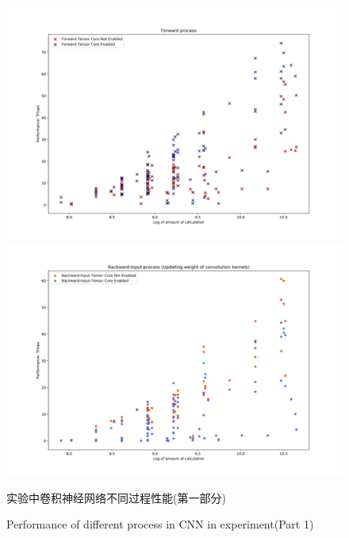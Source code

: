 \begin{figure}
	\centering
	\includegraphics[width=15cm]{figures/CNN-HALF-FWD.jpg}\\
	\includegraphics[width=15cm]{figures/CNN-HALF-BWD-FILTER.jpg}
	\renewcommand{\thefigure}{\arabic{section}-\arabic{figure} }
	\renewcommand{\figurename}{图}
	\caption{实验中卷积神经网络不同过程性能(第一部分)}
	\addtocounter{figure}{-1}
	\renewcommand{\thefigure}{\arabic{section}-\arabic{figure} }
	\renewcommand{\figurename}{Figure}
	\caption{Performance of different process in CNN in experiment(Part 1)}
	\label{Fig.CNNPerf-1}
\end{figure}

